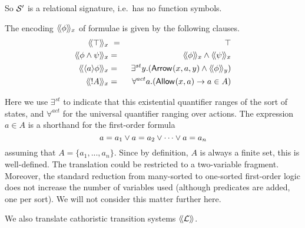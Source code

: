 \NI So $\mathcal{S}'$ is a relational signature, i.e.~has no function
symbols. 

\begin{definition}
The encoding $\langle\!\langle \phi \rangle\!\rangle_x$ of \cathoristic{} formulae is given by the following clauses.
\begin{eqnarray*}
  \SEMBTWO{\top}_x & \ = \ & \top
     \\
  \SEMBTWO{\phi \AND \psi}_x & = & \SEMBTWO{\phi}_x \AND \SEMBTWO{\psi}_x
     \\
  \SEMBTWO{\langle a \rangle \phi}_x & = & \exists^{st} y.(\ARROWTWO{}{x}{a}{y} \AND \SEMBTWO{\phi}_y)
     \\
  \SEMBTWO{\fBang A}_x & = & \forall^{act} a.(\ALLOWED{}{x}{a} \IMPLIES a \in A) 
\end{eqnarray*}

\end{definition}

\NI Here we use $\exists^{st}$ to indicate that this existential
quantifier ranges of the sort of states, and $\forall^{act}$ for the
universal quantifier ranging over actions. The expression $a \in A$ is
a shorthand for the first-order formula
\[
   a = a_1 \lor a = a_2 \lor \cdots \lor a = a_n
\]
assuming that $A = \{a_1, ..., a_n\}$. Since by definition, $A$ is
always a finite set, this is well-defined.  The translation could be
restricted to a two-variable fragment. Moreover, the standard
reduction from many-sorted to one-sorted first-order logic does not
increase the number of variables used (although predicates are added,
one per sort). We will not consider this matter further here.  

We also translate cathoristic transition systems $\langle\!\langle \mathcal{L} \rangle\!\rangle$.

